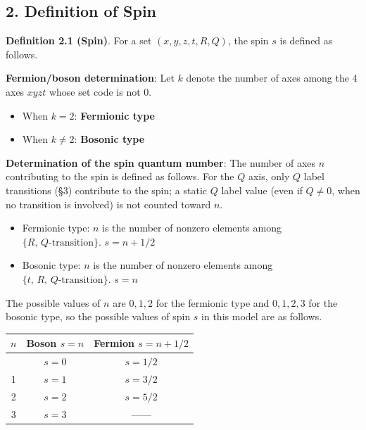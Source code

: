 \documentclass[
  a4paper,11pt]{article}
\newcounter{none}
\providecommand{\tightlist}{%
  \setlength{\itemsep}{0pt}\setlength{\parskip}{0pt}}
\theoremstyle{definition}
\theoremstyle{remark}
\begin{document}
\subsection{2. Definition of Spin}\label{definition-of-spin}

\textbf{Definition 2.1 (Spin)}. For a set \((x, y, z, t, R, Q)\), the
spin \(s\) is defined as follows.

\textbf{Fermion/boson determination}: Let \(k\) denote the number of
axes among the 4 axes \(xyzt\) whose set code is not \(0\).

\begin{itemize}
\tightlist
\item
  When \(k = 2\): \textbf{Fermionic type}
\item
  When \(k \neq 2\): \textbf{Bosonic type}
\end{itemize}

\textbf{Determination of the spin quantum number}: The number of axes
\(n\) contributing to the spin is defined as follows. For the \(Q\)
axis, only \(Q\) label transitions (§3) contribute to the spin; a static
\(Q\) label value (even if \(Q \neq 0\), when no transition is involved)
is not counted toward \(n\).

\begin{itemize}
\tightlist
\item
  Fermionic type: \(n\) is the number of nonzero elements among
  \(\{R,\, Q\text{-transition}\}\). \(s = n + 1/2\)
\item
  Bosonic type: \(n\) is the number of nonzero elements among
  \(\{t,\, R,\, Q\text{-transition}\}\). \(s = n\)
\end{itemize}

The possible values of \(n\) are \(0, 1, 2\) for the fermionic type and
\(0, 1, 2, 3\) for the bosonic type, so the possible values of spin
\(s\) in this model are as follows.

{\def\LTcaptype{none} %
\begin{longtable}[]{@{}ccc@{}}
\toprule\noalign{}
\(n\) & Boson \(s = n\) & Fermion \(s = n + 1/2\) \\
\midrule\noalign{}
\endhead
\bottomrule\noalign{}
\endlastfoot
0 & \(s = 0\) & \(s = 1/2\) \\
1 & \(s = 1\) & \(s = 3/2\) \\
2 & \(s = 2\) & \(s = 5/2\) \\
3 & \(s = 3\) & ------ \\
\end{longtable}
}
\end{document}
